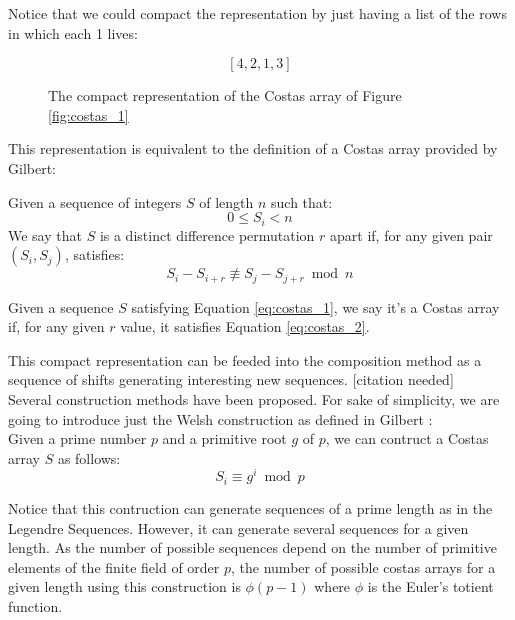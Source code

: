 Notice that we could compact the representation by just having a list of the
rows in which each 1 lives:

\begin{figure}[ht!]
  $$[4, 2, 1, 3]$$
  \caption{The compact representation of the Costas array of Figure
  \ref{fig:costas_1}}
  \label{fig:costas_2}
\end{figure}

This representation is equivalent to the definition of a Costas array provided
by Gilbert:

\begin{definition}\label{def:costas_1}
  Given a sequence of integers $S$ of length $n$ such that:
    \begin{equation}\label{eq:costas_1}
      0 \leq S_{i} < n
    \end{equation}
  We say that $S$ is a distinct difference permutation $r$ apart if,
  for any given pair $(S_{i}, S_{j})$, satisfies:
    \begin{equation}\label{eq:costas_2}
      S_{i} - S_{i+r} \not \equiv S_{j} - S_{j+r} \bmod n
    \end{equation}
\end{definition}

\begin{definition}
  Given a sequence $S$ satisfying Equation \ref{eq:costas_1}, we say it's a
  Costas array if, for any given $r$ value, it satisfies Equation
  \ref{eq:costas_2}.
\end{definition}

This compact representation can be feeded into the composition method as
a sequence of shifts generating interesting new sequences. [citation needed]\\

Several construction methods have
been proposed. For sake of simplicity, we are going to introduce just the Welsh
construction as defined in Gilbert \cite{gilbert_costas}:\\

Given a prime number $p$ and a primitive root $g$ of $p$, we can contruct a
Costas array $S$ as follows:
\begin{equation}
  S_{i} \equiv g^{i} \bmod p
\end{equation}

Notice that this contruction can generate sequences of a prime length as in
the Legendre Sequences. However, it can generate several sequences for a given
length. As the number of possible sequences depend on the number of primitive
elements of the finite field of order $p$, the number of possible costas arrays
for a given length using this construction is $\phi(p-1)$ where $\phi$ is the
Euler's totient function.
